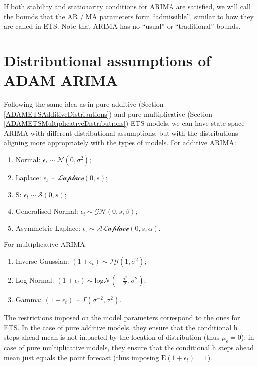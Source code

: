 \documentclass[
]{book}
\providecommand{\tightlist}{%
  \setlength{\itemsep}{0pt}\setlength{\parskip}{0pt}}
\theoremstyle{definition}
\theoremstyle{definition}
\theoremstyle{definition}
\theoremstyle{definition}
\theoremstyle{remark}
\begin{document}
If both stability and stationarity conditions for ARIMA are satisfied, we will call the bounds that the AR / MA parameters form ``admissible'', similar to how they are called in ETS. Note that ARIMA has no ``usual'' or ``traditional'' bounds.

\hypertarget{ADAMARIMADistributions}{%
\section{Distributional assumptions of ADAM ARIMA}\label{ADAMARIMADistributions}}

Following the same idea as in pure additive (Section \ref{ADAMETSAdditiveDistributions}) and pure multiplicative (Section \ref{ADAMETSMultiplicativeDistributions}) ETS models, we can have state space ARIMA with different distributional assumptions, but with the distributions aligning more appropriately with the types of models. For additive ARIMA:

\begin{enumerate}
\def\labelenumi{\arabic{enumi}.}
\tightlist
\item
  Normal: \(\epsilon_t \sim \mathcal{N}(0, \sigma^2)\);
\item
  Laplace: \(\epsilon_t \sim \mathcal{Laplace}(0, s)\);
\item
  S: \(\epsilon_t \sim \mathcal{S}(0, s)\);
\item
  Generalised Normal: \(\epsilon_t \sim \mathcal{GN}(0, s, \beta)\);
\item
  Asymmetric Laplace: \(\epsilon_t \sim \mathcal{ALaplace}(0, s, \alpha)\).
\end{enumerate}

For multiplicative ARIMA:

\begin{enumerate}
\def\labelenumi{\arabic{enumi}.}
\tightlist
\item
  Inverse Gaussian: \(\left(1+\epsilon_t \right) \sim \mathcal{IG}(1, \sigma^2)\);
\item
  Log Normal: \(\left(1+\epsilon_t \right) \sim \text{log}\mathcal{N}\left(-\frac{\sigma^2}{2}, \sigma^2\right)\);
\item
  Gamma: \(\left(1+\epsilon_t \right) \sim \mathcal{\Gamma}(\sigma^{-2}, \sigma^2)\).
\end{enumerate}

The restrictions imposed on the model parameters correspond to the ones for ETS. In the case of pure additive models, they ensure that the conditional h steps ahead mean is not impacted by the location of distribution (thus \(\mu_\epsilon=0\)); in case of pure multiplicative models, they ensure that the conditional h steps ahead mean just equals the point forecast (thus imposing \(\mathrm{E}(1+\epsilon_t)=1\)).
\end{document}
